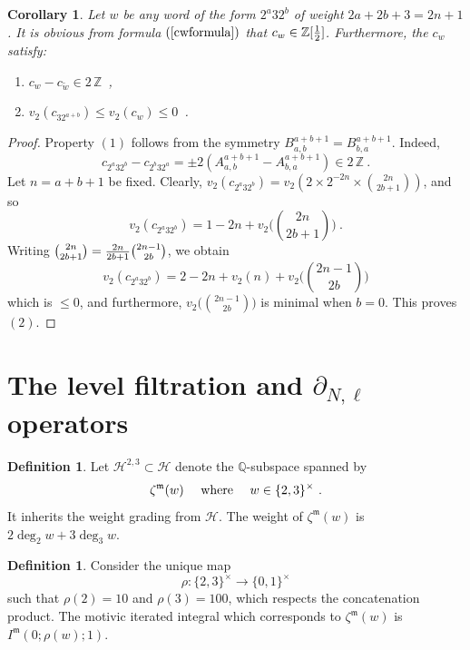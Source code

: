 \documentclass[10pt]{amsart}
\newtheorem{cor}[thm]{Corollary}
\theoremstyle{definition}
\newtheorem{defn}[thm]{Definition}
\theoremstyle{remark}
\numberwithin{equation}{section}
\newcommand{\Z}{\mathbb Z}
\newcommand{\Ho}{\mathcal{H}}
\newcommand{\zetam}{\zeta^{ \mathfrak{m}}}
\newcommand{\Imot}{I^{\mathfrak{m}}}
\newcommand{\Q}{\mathbb Q}
\newcommand{\To}{\longrightarrow}
\begin{document}
\begin{cor} \label{cor2adic}  Let $w$ be any word of the form $2^a32^b$ of weight $2a+2b+3 = 2n+1$.  
It is obvious from formula $(\ref{cwformula})$  that $c_w \in \Z[{1\over 2}]$. 
Furthermore, the 
  $c_w$ satisfy:
  
  \begin{enumerate}
  \item  $ c_{w} - c_{\widetilde{w}} \in 2 \, \Z$\ ,
  \item $ v_2(c_{32^{a+b}}) \leq v_2(c_{w})\leq 0 $\ .
\end{enumerate}
 \end{cor}
 \begin{proof}  Property $(1)$ follows from the symmetry $B^{a+b+1}_{a,b}=B^{a+b+1}_{b,a}$. Indeed,
 $$c_{2^a32^b}-c_{2^b32^a} =  \pm 2 (A^{a+b+1}_{a,b}-A^{a+b+1}_{b,a})\in 2\,  \Z\ .$$
Let $n=a+b+1$ be fixed. Clearly,  $v_2(c_{2^a32^b}) = v_2 ( 2\times 2^{-2n}\times  \binom{2n}{2b+1})$, and so
 $$v_2(c_{2^a32^b}) = 1-2n+ v_2\big(\textstyle{\binom{2n}{2b+1}}\big)\ .$$
 Writing $\binom{2n}{2b+1} = {2n \over 2b+1} \binom{2n-1}{2b}$, we obtain
 $$v_2(c_{2^a32^b}) = 2-2n+v_2(n) + v_2\big( \textstyle{\binom{2n-1}{2b}}\big) $$
which is  $\leq 0$, and furthermore, $v_2\big( \textstyle{\binom{2n-1}{2b}}\big)$ is minimal when $b=0$.  This proves $(2)$.
 \end{proof}




\section{The level filtration and $\partial_{N,\ell}$ operators}



\begin{defn}
Let $\Ho^{2,3}\subset \Ho$ denote the $\Q$-subspace  spanned by
\begin{equation}\label{Ho23gen}
\zetam(w) \quad  \hbox{ where } \quad  w\in \{2,3\}^{\times}\ .
\end{equation}
It inherits the weight grading from $\Ho$. The weight of  $\zetam(w)$ is $2\deg_2 w+ 3\deg_3 w$.
\end{defn}

\begin{defn}Consider the unique map \begin{equation} \rho: \{2,3\}^{\times} \To \{0,1\}^{\times}
\end{equation} 
 such that $\rho(2)=10$ and $\rho(3)=100$, which respects the concatenation product.
The motivic iterated integral which corresponds to $\zetam(w)$ is $\Imot(0;\rho(w);1)$.
\end{defn}
\end{document}
